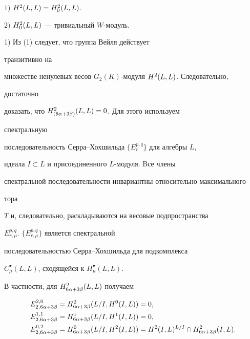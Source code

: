  


\begin{lem} 


$1)$ $H^2(L,L)=H^2_0(L,L)$. 


 


$2)$ $H^2_0(L,L)$ --- тривиальный $W$-модуль. 


\end{lem} 


 


\begin{pf} 1) Из (1) следует, что группа Вейля действует 


транзитивно на 


множестве ненулевых весов $G_2(K)$-модуля $H^2(L,L)$. Следовательно, 


достаточно 


доказать, что $H^2_{(6\alpha+3\beta)}(L,L)=0$. Для этого используем 


спектральную 


последовательность Серра--Хохшильда $\{E_r^{p,q}\}$ для алгебры $L$, 


идеала $I\subset L$ и присоединенного $L$-модуля. Bсе члены 


спектральной последовательности инвариантны относительно максимального 


тора 


$T$ и, следовательно, раскладываются на весовые подпространства 


$E_{r,\mu}^{p,q}$.\; $\{E_{r,\mu}^{p,q}\}$ является спектральной 


последовательностью Серра--Хохшильда для подкомплекса 


$C^{\bullet}_{\mu}(L,L)$, сходящейся к $H_{\mu}^{\bullet}(L,L)$. 


В частности, для $H_{6\alpha+3\beta}^2(L,L)$ получаем 


\begin{align*} 


E^{2,0}_{2,6\a+3\b}&=H_{6\a+3\b}^{2}(L/I,H^{0}(I,L))=0,\\ 


E^{1,1}_{2,6\a+3\b}&=H_{6\a+3\b}^{1}(L/I,H^{1}(I,L))=0,\\ 


E^{0,2}_{2,6\a+3\b}&=H_{6\a+3\b}^{0}(L/I,H^{2}(I,L))=H^{2}(I,L)^{L/I} 


\cap 


H_{6\a+3\b}^2(I,L). 


\end{align*} 



\end{pf}
